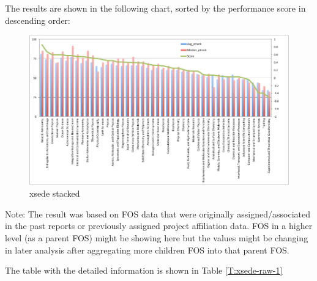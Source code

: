 \documentclass{sig-alternate}
\begin{document}
The results are shown in the following chart, sorted by the performance score in descending order:


\begin{figure}[htb] 
  \centering 
    \includegraphics[width=1.0\textwidth]{images-new/a.pdf} 
  \caption{xsede stacked}\label{F:xsede-stacked} 
\end{figure} 


Note: The result was based on FOS data that were originally assigned/associated in the past reports or previously assigned project affiliation data. FOS in a higher level (as a parent FOS) might be showing here but the values might be changing in later analysis after aggregating more children FOS into that parent FOS.

The table with the detailed information is shown in Table \ref{T:xsede-raw-1}
\end{document}

